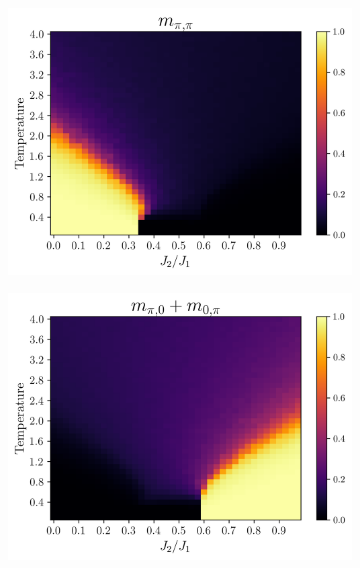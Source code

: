 \documentclass[../thesis_main.tex]{subfiles}
\begin{document}
\begin{figure}[!htb]
    \centering
    \begin{subfigure}[b]{0.43\textwidth}  %
        \centering
        \includegraphics[width=\textwidth]{images/j1-j2/phase_diagrams/p=0.15/M_pi,pi_p=0.15.png}
    \end{subfigure}
    \begin{subfigure}[b]{0.43\textwidth}
        \centering
        \includegraphics[width=\textwidth]{images/j1-j2/phase_diagrams/p=0.15/M_pi,0_p=0.15.png}
    \end{subfigure}
    \begin{subfigure}[b]{0.43\textwidth}

\end{subfigure}
\end{figure}
\end{document}
